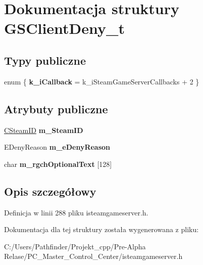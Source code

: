 \hypertarget{struct_g_s_client_deny__t}{}\section{Dokumentacja struktury G\+S\+Client\+Deny\+\_\+t}
\label{struct_g_s_client_deny__t}
\subsection*{Typy publiczne}
\begin{DoxyCompactItemize}
\item 
\mbox{\label{struct_g_s_client_deny__t_a480afd2d4f1d384f02d7cbedbd1254da}} 
enum \{ {\bfseries k\+\_\+i\+Callback} = k\+\_\+i\+Steam\+Game\+Server\+Callbacks + 2
 \}
\end{DoxyCompactItemize}
\subsection*{Atrybuty publiczne}
\begin{DoxyCompactItemize}
\item 
\mbox{\label{struct_g_s_client_deny__t_acab5153c26dd8f6745a3dc6ac6d4613f}} 
\hyperlink{class_c_steam_i_d}{C\+Steam\+ID} {\bfseries m\+\_\+\+Steam\+ID}
\item 
\mbox{\label{struct_g_s_client_deny__t_a1e984d531f47e17081b73a760e4137d5}} 
E\+Deny\+Reason {\bfseries m\+\_\+e\+Deny\+Reason}
\item 
\mbox{\label{struct_g_s_client_deny__t_afeef91fbaff70aee76737e7944a3d920}} 
char {\bfseries m\+\_\+rgch\+Optional\+Text} \mbox{[}128\mbox{]}
\end{DoxyCompactItemize}


\subsection{Opis szczegółowy}


Definicja w linii 288 pliku isteamgameserver.\+h.



Dokumentacja dla tej struktury została wygenerowana z pliku\+:\begin{DoxyCompactItemize}
\item 
C\+:/\+Users/\+Pathfinder/\+Projekt\+\_\+cpp/\+Pre-\/\+Alpha Relase/\+P\+C\+\_\+\+Master\+\_\+\+Control\+\_\+\+Center/isteamgameserver.\+h\end{DoxyCompactItemize}
